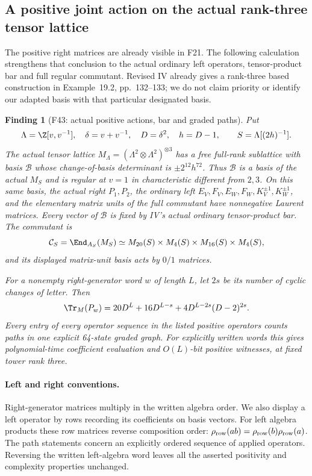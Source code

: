 \documentclass[11pt,a4paper]{article}
\newcommand{\fid}[1]{\textsf{#1}}\newcommand{\gate}[1]{\textsf{#1}}
\theoremstyle{named}\newtheorem{finding}{Finding}[section]
\theoremstyle{definition}\newtheorem{definition}[finding]{Definition}
\theoremstyle{remark}\newtheorem{remark}[finding]{Remark}
\begin{document}
\subsection{A positive joint action on the actual rank-three tensor lattice}
The positive right matrices are already visible in \fid{F21}. The
following calculation strengthens that conclusion to the actual
ordinary left operators, tensor-product bar and full regular
commutant. Revised IV already gives a rank-three based construction
in Example~19.2, pp.~132--133; we do not claim priority or identify
our adapted basis with that particular designated basis.

\begin{finding}[\fid{F43}: actual positive actions, bar and graded paths]\label{f:positivejoint}
Put
\[
 \Lambda=\Z[v,v^{-1}],\quad \delta=v+v^{-1},\quad
 D=\delta^2,\quad h=D-1,
 \qquad S=\Lambda[(2h)^{-1}].
\]
The actual tensor lattice $M_\Lambda=(\Lambda^2\otimes\Lambda^2)^{\otimes3}$
has a free full-rank sublattice with basis $\mathcal B$ whose
change-of-basis determinant is $\pm2^{12}h^{72}$.
Thus $\mathcal B$ is a basis of the actual $M_S$ and is regular
at $v=1$ in characteristic different from $2,3$.
On this same basis, the actual right $P_1,P_2$, the ordinary left
$E_V,F_V,E_W,F_W,K_V^{\pm1},K_W^{\pm1}$, and the elementary
matrix units of the full commutant have nonnegative Laurent matrices.
Every vector of $\mathcal B$ is fixed by IV's actual ordinary
tensor-product bar. The commutant is
\[
 \mathcal C_S=\End_{A_S}(M_S)
 \simeq M_{20}(S)\times M_4(S)\times M_{16}(S)\times M_4(S),
\]
and its displayed matrix-unit basis acts by $0/1$ matrices.

For a nonempty right-generator word $w$ of length $L$, let $2s$
be its number of cyclic changes of letter. Then
\begin{equation}\label{eq:allwordpositive}
 \Tr_M(P_w)=20D^L+16D^{L-s}
              +4D^{L-2s}(D-2)^{2s}.
\end{equation}
Every entry of every operator sequence in the listed positive
operators counts paths in one explicit 64-state graded graph.
For explicitly written words this gives polynomial-time coefficient
evaluation and $O(L)$-bit positive witnesses, at fixed tower rank three.
\end{finding}

\paragraph{Left and right conventions.}
Right-generator matrices multiply in the written algebra order.
We also display a left operator by rows recording its coefficients
on basis vectors. For left algebra products these row matrices
reverse composition order: $\rho_{\rm row}(ab)=
\rho_{\rm row}(b)\rho_{\rm row}(a)$.
The path statements concern an explicitly ordered sequence of
applied operators. Reversing the written left-algebra word leaves
all the asserted positivity and complexity properties unchanged.
\end{document}
